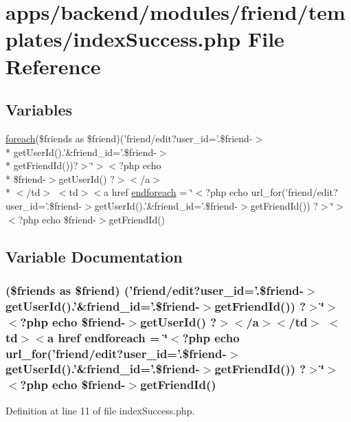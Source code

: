 \hypertarget{backend_2modules_2friend_2templates_2index_success_8php}{\section{apps/backend/modules/friend/templates/index\-Success.php File Reference}
\label{backend_2modules_2friend_2templates_2index_success_8php}
}
\subsection*{Variables}
\begin{DoxyCompactItemize}
\item 
\hyperlink{presse_2modules_2news_2templates_2index_success_8php_abc56db52b2e9a59bcd5c9e45ac5cb332}{foreach}(\$friends as \$friend)('friend/edit?user\-\_\-id='.\$friend-\/$>$\\*
get\-User\-Id().'\&friend\-\_\-id='.\$friend-\/$>$\\*
get\-Friend\-Id())?$>$\char`\"{}$>$$<$?php echo \\*
\$friend-\/$>$get\-User\-Id() ?$>$$<$/a$>$\\*
$<$/td$>$ $<$td$>$$<$a href \hyperlink{backend_2modules_2friend_2templates_2index_success_8php_abc55497f8fcd43ff9b93182238efbf9f}{endforeach} = \char`\"{}$<$?php echo url\-\_\-for('friend/edit?user\-\_\-id='.\$friend-\/$>$get\-User\-Id().'\&friend\-\_\-id='.\$friend-\/$>$get\-Friend\-Id()) ?$>$\char`\"{}$>$$<$?php echo \$friend-\/$>$get\-Friend\-Id()
\end{DoxyCompactItemize}


\subsection{Variable Documentation}
\hypertarget{backend_2modules_2friend_2templates_2index_success_8php_abc55497f8fcd43ff9b93182238efbf9f}{
\subsubsection[{endforeach}]{ (\$friends as \$friend) ('friend/edit?user\-\_\-id='.\$friend-\/$>$get\-User\-Id().'\&friend\-\_\-id='.\$friend-\/$>$get\-Friend\-Id()) ?$>$\char`\"{}$>$$<$?php echo \$friend-\/$>$get\-User\-Id() ?$>$$<$/a$>$$<$/td$>$ $<$td$>$$<$a href endforeach = \char`\"{}$<$?php echo url\-\_\-for('friend/edit?user\-\_\-id='.\$friend-\/$>$get\-User\-Id().'\&friend\-\_\-id='.\$friend-\/$>$get\-Friend\-Id()) ?$>$\char`\"{}$>$$<$?php echo \$friend-\/$>$get\-Friend\-Id()}}\label{backend_2modules_2friend_2templates_2index_success_8php_abc55497f8fcd43ff9b93182238efbf9f}


Definition at line 11 of file index\-Success.\-php.


